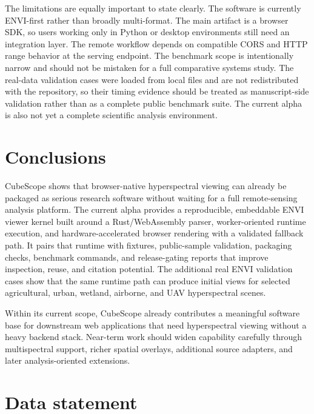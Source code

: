 \documentclass[preprint,12pt,a4paper]{elsarticle}
\begin{document}
The limitations are equally important to state clearly. The software is
currently ENVI-first rather than broadly multi-format. The main artifact is a
browser SDK, so users working only in Python or desktop environments still need
an integration layer. The remote workflow depends on compatible CORS and HTTP
range behavior at the serving endpoint. The benchmark scope is intentionally
narrow and should not be mistaken for a full comparative systems study. The
real-data validation cases were loaded from local files and are not
redistributed with the repository, so their timing evidence should be treated
as manuscript-side validation rather than as a complete public benchmark suite.
The current alpha is also not yet a complete scientific analysis environment.

\section{Conclusions}

CubeScope shows that browser-native hyperspectral viewing can already be
packaged as serious research software without waiting for a full remote-sensing
analysis platform. The current alpha provides a reproducible, embeddable ENVI
viewer kernel built around a Rust/WebAssembly parser, worker-oriented runtime
execution, and hardware-accelerated browser rendering with a validated fallback
path. It pairs that runtime with fixtures, public-sample validation, packaging
checks, benchmark commands, and release-gating reports that improve inspection,
reuse, and citation potential. The additional real ENVI validation cases show
that the same runtime path can produce initial views for selected agricultural,
urban, wetland, airborne, and UAV hyperspectral scenes.

Within its current scope, CubeScope already contributes a meaningful software
base for downstream web applications that need hyperspectral viewing without a
heavy backend stack. Near-term work should widen capability carefully through
multispectral support, richer spatial overlays, additional source adapters, and
later analysis-oriented extensions.

\section*{Data statement}
\end{document}
